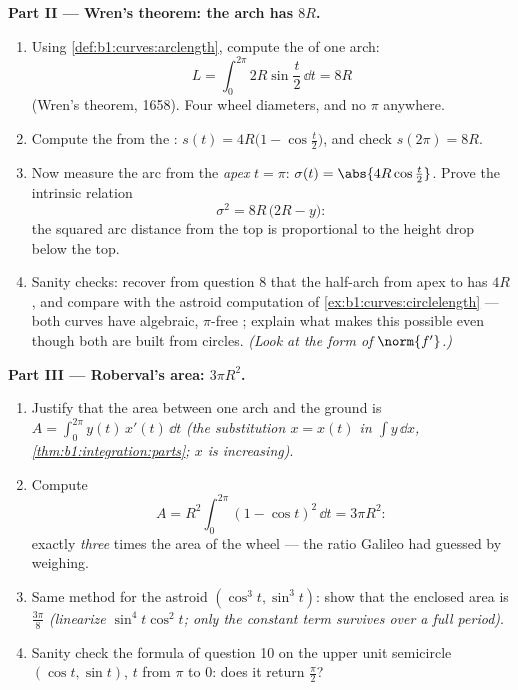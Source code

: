 \begin{problem}
\medskip
\noindent\textbf{Part II --- Wren's theorem: the arch has 
$8R$.}
\begin{enumerate}[resume]
  \item Using \cref{def:b1:curves:arclength}, compute the 
        of one arch:
        \[
        L = \int_0^{2\pi} 2R\sin\frac t2\,\dd t = 8R
        \]
        (Wren's theorem, 1658). Four wheel diameters, and no
        $\pi$ anywhere.
  \item Compute the  from the : $s(t) =
        4R\bigl(1 - \cos\frac t2\bigr)$, and check $s(2\pi) =
        8R$.
  \item Now measure the arc from the \emph{apex} $t = \pi$:
        $\sigma(t) = \abs{4R\cos\frac t2}$. Prove the intrinsic
        relation
        \[
        \sigma^2 = 8R\,\bigl(2R - y\bigr) :
        \]
        the squared arc distance from the top is proportional to
        the height drop below the top.
  \item Sanity checks: recover from question 8 that the half-arch
        from apex to  has  $4R$, and compare with the
        astroid computation of \cref{ex:b1:curves:circlelength}
        --- both curves have algebraic, $\pi$-free ;
        explain what makes this possible even though both are
        built from circles. \emph{(Look at the form of
        $\norm{f'}$.)}
\end{enumerate}

\medskip
\noindent\textbf{Part III --- Roberval's area: $3\pi R^2$.}
\begin{enumerate}[resume]
  \item Justify that the area between one arch and the ground is
        $A = \int_0^{2\pi} y(t)\,x'(t)\,\dd t$ \emph{(the
        substitution $x = x(t)$ in $\int y\,\dd x$,
        \cref{thm:b1:integration:parts}; $x$ is increasing)}.
  \item Compute
        \[
        A = R^2\int_0^{2\pi}(1 - \cos t)^2\,\dd t = 3\pi R^2 :
        \]
        exactly \emph{three} times the area of the wheel ---
        the ratio Galileo had guessed by weighing.
  \item Same method for the astroid $(\cos^3t, \sin^3t)$: show
        that the enclosed area is $\frac{3\pi}8$
        \emph{(linearize $\sin^4 t\cos^2 t$; only the constant
        term survives over a full period)}.
  \item Sanity check the formula of question 10 on the upper unit
        semicircle $(\cos t, \sin t)$, $t$ from $\pi$ to $0$:
        does it return $\frac\pi2$?
\end{enumerate}


\end{problem}
